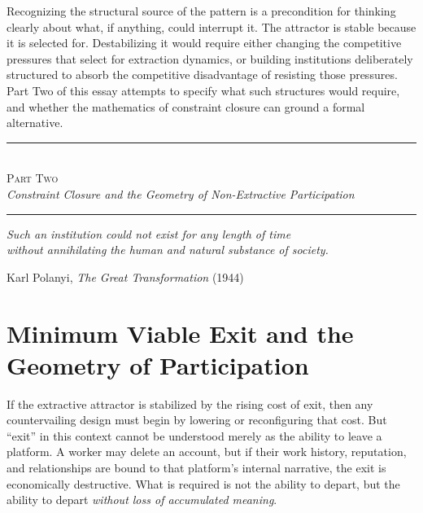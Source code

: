 \documentclass[12pt, a4paper]{article}
\begin{document}
Recognizing the structural source of the pattern is a precondition for
thinking clearly about what, if anything, could interrupt it. The attractor
is stable because it is selected for. Destabilizing it would require either
changing the competitive pressures that select for extraction dynamics, or
building institutions deliberately structured to absorb the competitive
disadvantage of resisting those pressures. Part Two of this essay attempts
to specify what such structures would require, and whether the mathematics
of constraint closure can ground a formal alternative.


\vspace{2.4em}
\begin{center}
  \rule{0.5\textwidth}{0.4pt}\\[0.9em]
  {\large\scshape Part Two}\\[0.3em]
  {\itshape Constraint Closure and the Geometry of Non-Extractive Participation}\\[0.5em]
  \rule{0.5\textwidth}{0.4pt}
\end{center}
\vspace{1.2em}

\epigraph{%
  \itshape Such an institution could not exist for any length of time\\
  without annihilating the human and natural substance of society.%
}{Karl Polanyi, \textit{The Great Transformation} (1944)}

\vspace{1.2em}

\section{Minimum Viable Exit and the Geometry of Participation}

If the extractive attractor is stabilized by the rising cost of exit, then any
countervailing design must begin by lowering or reconfiguring that cost. But
``exit'' in this context cannot be understood merely as the ability to leave a
platform. A worker may delete an account, but if their work history, reputation,
and relationships are bound to that platform's internal narrative, the exit is
economically destructive. What is required is not the ability to depart, but the
ability to depart \emph{without loss of accumulated meaning}.
\end{document}
